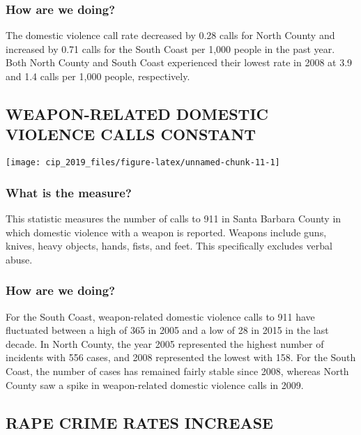 \documentclass[]{book}
\theoremstyle{definition}
\theoremstyle{definition}
\theoremstyle{definition}
\theoremstyle{remark}
\begin{document}
\subsubsection*{How are we doing?}\label{how-are-we-doing-4}

The domestic violence call rate decreased by 0.28 calls for North County
and increased by 0.71 calls for the South Coast per 1,000 people in the
past year. Both North County and South Coast experienced their lowest
rate in 2008 at 3.9 and 1.4 calls per 1,000 people, respectively.

\subsection*{WEAPON-RELATED DOMESTIC VIOLENCE CALLS
CONSTANT}\label{weapon-related-domestic-violence-calls-constant}

\texttt{[image: cip\_2019\_files/figure-latex/unnamed-chunk-11-1]}

\subsubsection*{What is the measure?}\label{what-is-the-measure-3}

This statistic measures the number of calls to 911 in Santa Barbara
County in which domestic violence with a weapon is reported. Weapons
include guns, knives, heavy objects, hands, fists, and feet. This
specifically excludes verbal abuse.

\subsubsection*{How are we doing?}\label{how-are-we-doing-5}

For the South Coast, weapon-related domestic violence calls to 911 have
fluctuated between a high of 365 in 2005 and a low of 28 in 2015 in the
last decade. In North County, the year 2005 represented the highest
number of incidents with 556 cases, and 2008 represented the lowest with
158. For the South Coast, the number of cases has remained fairly stable
since 2008, whereas North County saw a spike in weapon-related domestic
violence calls in 2009.

\subsection*{RAPE CRIME RATES INCREASE}\label{rape-crime-rates-increase}
\end{document}
